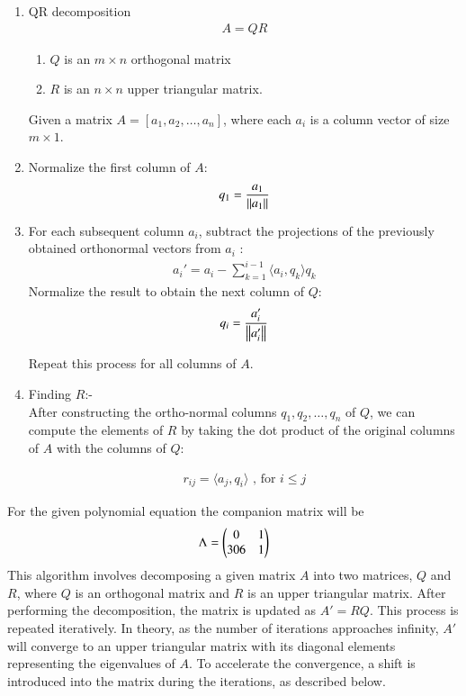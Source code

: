 \documentclass[journal]{IEEEtran}
\begin{document}
\begin{enumerate}
\item QR decomposition 
\begin{align}
A = QR
\end{align}
\begin{enumerate}
    \item $Q$ is an $ m \times n $ orthogonal matrix
    \item $R$ is an $n \times n$ upper triangular matrix.
\end{enumerate}
Given a matrix $ A = [a_1, a_2, \dots, a_n] $, where each $ a_i $ is a column vector of size $ m \times 1 $.

\item Normalize the first column of $A$:
\begin{align}
q_1 = \frac{a_1}{\left\lVert a_1\right\rVert}
\end{align}

\item  For each subsequent column $ a_i $, subtract the projections of the previously obtained orthonormal vectors from $ a_i $ :
\begin{align}
a_i' = a_i - \sum_{k=1}^{i-1} \langle a_i, q_k \rangle q_k
\end{align}
Normalize the result to obtain the next column of \( Q \):
\begin{align}
q_i = \frac{a_i'}{\left\lVert a_i'\right\rVert}
\end{align}

Repeat this process for all columns of \( A \).

\item Finding $R$:- \\
After constructing the ortho-normal columns $ q_1, q_2, \dots, q_n $ of $Q$, we can compute the elements of $R$ by taking the dot product of the original columns of $A$ with the columns of $Q$:

\begin{align}
    r_{ij} = \langle a_j, q_i \rangle \text{ , for  }  i \leq j 
\end{align}
\end{enumerate}
For the given polynomial equation the companion matrix will be
\begin{align}
	\Lambda = \begin{pmatrix}0 & 1\\306 & 1\end{pmatrix}
\end{align}
This algorithm involves decomposing a given matrix $A$ into two matrices, $Q$ and $R$, where $Q$ is an orthogonal matrix and $R$ is an upper triangular matrix. After performing the decomposition, the matrix is updated as $A' = RQ$. This process is repeated iteratively. In theory, as the number of iterations approaches infinity, $A'$ will converge to an upper triangular matrix with its diagonal elements representing the eigenvalues of $A$. To accelerate the convergence, a shift is introduced into the matrix during the iterations, as described below.\\
\end{document}
